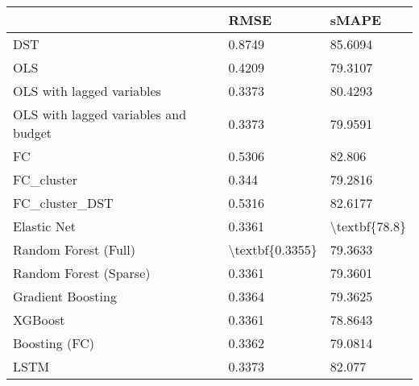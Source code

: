 \begin{tabular}{lll}
\toprule
{} &             RMSE &          sMAPE \\
\midrule
DST                                  &           0.8749 &        85.6094 \\
OLS                                  &           0.4209 &        79.3107 \\
OLS with lagged variables            &           0.3373 &        80.4293 \\
OLS with lagged variables and budget &           0.3373 &        79.9591 \\
FC                                   &           0.5306 &         82.806 \\
FC\_cluster                           &            0.344 &        79.2816 \\
FC\_cluster\_DST                       &           0.5316 &        82.6177 \\
Elastic Net                          &           0.3361 &  \textbackslash textbf\{78.8\} \\
Random Forest (Full)                 &  \textbackslash textbf\{0.3355\} &        79.3633 \\
Random Forest (Sparse)               &           0.3361 &        79.3601 \\
Gradient Boosting                    &           0.3364 &        79.3625 \\
XGBoost                              &           0.3361 &        78.8643 \\
Boosting (FC)                        &           0.3362 &        79.0814 \\
LSTM                                 &           0.3373 &         82.077 \\
\bottomrule
\end{tabular}
